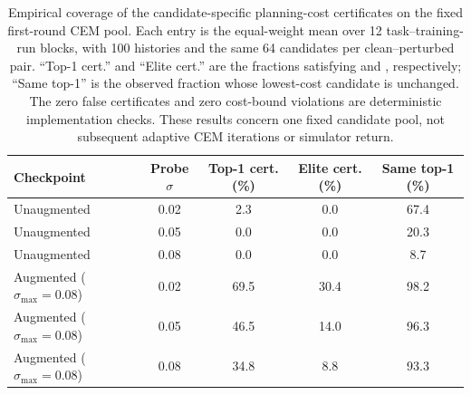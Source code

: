 \begin{table}[!htb]
\centering
\caption{Empirical coverage of the candidate-specific planning-cost
certificates on the fixed first-round CEM pool. Each entry is the equal-weight
mean over 12 task--training-run blocks, with 100 histories and the same 64
candidates per clean--perturbed pair. ``Top-1 cert.'' and ``Elite cert.'' are
the fractions satisfying  and
, respectively; ``Same top-1'' is the
observed fraction whose lowest-cost candidate is unchanged. The zero false
certificates and zero cost-bound violations are deterministic implementation
checks. These results concern one fixed candidate pool, not subsequent adaptive
CEM iterations or simulator return.}
\label{tab:fixed-pool-acpc-certificate}
\small
\setlength{\tabcolsep}{5pt}
\begin{tabular}{lcccc}
\toprule
Checkpoint & Probe $\sigma$ & Top-1 cert. (\%) & Elite cert. (\%) & Same top-1 (\%) \\
\midrule
Unaugmented & 0.02 & 2.3 & 0.0 & 67.4 \\
Unaugmented & 0.05 & 0.0 & 0.0 & 20.3 \\
Unaugmented & 0.08 & 0.0 & 0.0 & 8.7 \\
\midrule
Augmented ($\sigma_{\max}=0.08$) & 0.02 & 69.5 & 30.4 & 98.2 \\
Augmented ($\sigma_{\max}=0.08$) & 0.05 & 46.5 & 14.0 & 96.3 \\
Augmented ($\sigma_{\max}=0.08$) & 0.08 & 34.8 & 8.8 & 93.3 \\
\bottomrule
\end{tabular}
\end{table}
